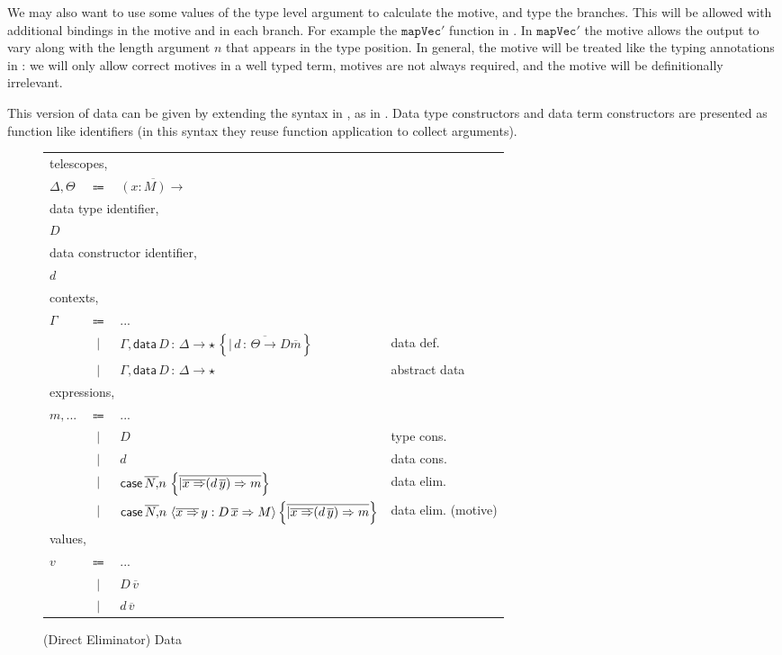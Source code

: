 We may also want to use some values of the type level argument to calculate the motive, and type the branches.
This will be allowed with additional bindings in the motive and in each branch.
For example the $\mathtt{mapVec'}$ function in .
In $\mathtt{mapVec'}$ the motive allows the output to vary along with the length argument $n$ that appears in the type position.
In general, the motive will be treated like the typing annotations in : we will only allow correct motives in a well typed term, motives are not always required, and the motive will be definitionally irrelevant.

This version of data can be given by extending the \slang{} syntax in , as in .
Data type constructors and data term constructors are presented as function like identifiers (in this syntax they reuse function application to collect arguments).

\begin{figure}
\begin{tabular}{lcll}

\multicolumn{4}{l}{telescopes,}\tabularnewline
$\Delta,\varTheta$ & $\Coloneqq$ & $\overline{\left(x:M\right)\rightarrow}$ & \tabularnewline
\multicolumn{4}{l}{data type identifier,}\tabularnewline
$D$ &  &  & \tabularnewline
\multicolumn{4}{l}{data constructor identifier,}\tabularnewline
$d$ &  &  & \tabularnewline
\multicolumn{4}{l}{contexts,}\tabularnewline
$\Gamma$ & $\Coloneqq$ & ... & \tabularnewline
 & $|$ & $\Gamma,\mathsf{data}\,D\,:\,\Delta\rightarrow\star\,\left\{ \overline{|\,d\,:\,\varTheta\rightarrow D\overline{m}}\right\} $ & data def.\tabularnewline
 & $|$ & $\Gamma,\mathsf{data}\,D\,:\,\Delta\rightarrow\star$ & abstract data\tabularnewline
 \multicolumn{4}{l}{expressions,}\tabularnewline
$m,...$ & $\Coloneqq$ & ... & \tabularnewline
 & $|$ & $D$ & type cons.\tabularnewline
 & $|$ & $d$ & data cons.\tabularnewline
 & $|$ & $\mathsf{case}{}\,\overline{N,}n\,\left\{ \overline{|\overline{x\Rightarrow}(d\,\overline{y})\Rightarrow m}\right\} $ & data elim.\tabularnewline
 & $|$ & $\mathsf{case}{}\,\overline{N,}n\,\left\langle \overline{x\Rightarrow}\,y:D\,\overline{x}\Rightarrow M\right\rangle \left\{ \overline{|\overline{x\Rightarrow}(d\,\overline{y})\Rightarrow m}\right\} $ & data elim. (motive)\tabularnewline
\multicolumn{4}{l}{values,}\tabularnewline
$v$ & $\Coloneqq$ & ... & \tabularnewline
 & $|$ & $D\,\overline{v}$ & \tabularnewline
 & $|$ & $d\,\overline{v}$ & \tabularnewline
\end{tabular}

\caption{\SLang{} (Direct Eliminator) Data}
\label{fig:surface-data-min}
\end{figure}

